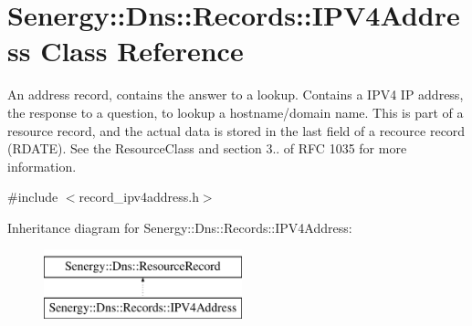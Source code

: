 \hypertarget{class_senergy_1_1_dns_1_1_records_1_1_i_p_v4_address}{\section{Senergy\-:\-:Dns\-:\-:Records\-:\-:I\-P\-V4\-Address Class Reference}
\label{class_senergy_1_1_dns_1_1_records_1_1_i_p_v4_address}
}


An address record, contains the answer to a lookup. Contains a I\-P\-V4 I\-P address, the response to a question, to lookup a hostname/domain name. This is part of a resource record, and the actual data is stored in the last field of a recource record (R\-D\-A\-T\-E). See the Resource\-Class and section 3.. of R\-F\-C 1035 for more information.  




{\ttfamily \#include $<$record\-\_\-ipv4address.\-h$>$}

Inheritance diagram for Senergy\-:\-:Dns\-:\-:Records\-:\-:I\-P\-V4\-Address\-:\begin{figure}[H]
\begin{center}
\leavevmode
\includegraphics[height=2.000000cm]{class_senergy_1_1_dns_1_1_records_1_1_i_p_v4_address}
\end{center}
\end{figure}
